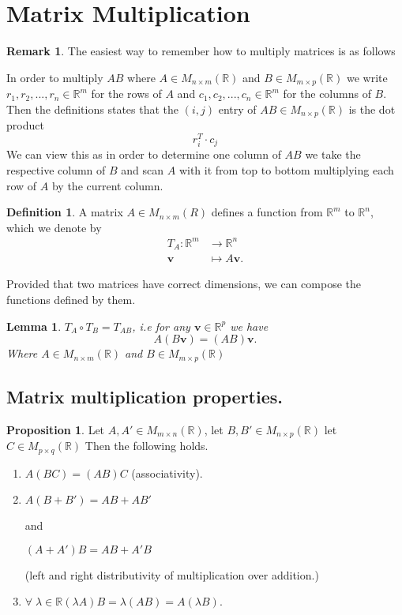 \documentclass[11pt,a4paper]{article}
\newcommand\R{\mathbb{R}}
\newtheorem{lemma}{Lemma}
\theoremstyle{definition}
\newtheorem{definition}{Definition}
\newtheorem{proposition}{Proposition}
\newtheorem{remark}{Remark}
\begin{document}
\section{Matrix Multiplication}
\begin{remark}
   The easiest way to remember how to multiply matrices is as follows 
   
   In order to multiply $AB$ where $A \in M_{n \times m} (\R) $ and $B \in M_{m \times p} (\R) $ we write
   $ r_1, r_2, ..., r_n \in \R^m $ for the rows of $A$ and $ c_1, c_2, ..., c_n \in \R^m $ for the columns of $B$. 
   Then the definitions states that the $(i, j)$ entry of $AB \in M_{n \times p} (\R) $ is the dot product
   \[ r_i^T \cdot c_j\]
   We can view this as in order to determine one column of $AB$ we take the respective column of $B$ and scan $A$ with it from top to bottom multiplying each row of $A$ 
   by the current column.
\end{remark}

\begin{definition}
    A matrix $ A \in M_{n \times m} (R) $ defines a function from $\R^m $ to $ \R^n $, which we denote by
    \[\begin{split}
        T_A : \R^m &\to \R^n \\
        \textbf{v} &\mapsto A\textbf{v}.
    \end{split}
    \]
\end{definition}
Provided that two matrices have correct dimensions, we can compose the functions defined by them.
\begin{lemma}
    $T_A \circ T_B = T_{AB} $, i.e for any $\textbf{v} \in \R^p $ we have
    \[ A(B\textbf{v}) = (AB) \textbf{v}.\]
    Where $A \in M_{n \times m} (\R) $ and $B \in M_{m \times p} (\R) $ 
\end{lemma}

\subsection{Matrix multiplication properties.}
\begin{proposition}
    Let $ A, A' \in M_{m \times n} (\R) $, let $ B, B' \in M_{n \times p} (\R) $ let $C \in M_{p \times q} (\R)$ Then the following holds. 
    \begin{enumerate}
        \item $A(BC) = (AB)C $ (associativity).
        \item $A(B + B') = AB + AB' $
        
        and

        $(A + A')B = AB + A'B $ 

        (left and right distributivity of multiplication over addition.)
        \item $ \forall \; \lambda \in \R (\lambda A)B = \lambda(AB) = A(\lambda B) $.
    \end{enumerate}
\end{proposition}
\end{document}
